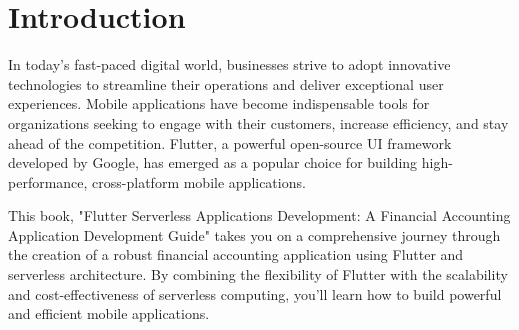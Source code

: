 
\section*{Introduction}
\vspace*{-2.4mm}

In today's fast-paced digital world, businesses strive to adopt innovative technologies to streamline their 
operations and deliver exceptional user experiences. Mobile applications have become indispensable tools 
for organizations seeking to engage with their customers, increase efficiency, and stay ahead of the competition. 
Flutter, a powerful open-source UI framework developed by Google, has emerged as a popular choice for building 
high-performance, cross-platform mobile applications.

This book, "Flutter Serverless Applications Development: A Financial Accounting Application Development Guide" 
takes you on a comprehensive journey through the creation of a robust financial accounting application using 
Flutter and serverless architecture. By combining the flexibility of Flutter with the scalability and 
cost-effectiveness of serverless computing, you'll learn how to build powerful and efficient mobile applications.

